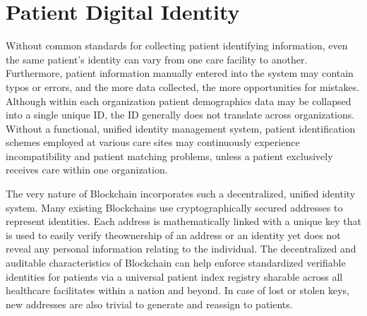 \documentclass[12pt]{report}
\begin{document}
\section{Patient Digital Identity}
\par Without common standards for collecting patient identifying information, even the
same patient’s identity can vary from one care facility to another.  Furthermore, patient information manually
entered into the system may contain typos or errors, and the more data collected, the more
opportunities for mistakes. Although within each organization patient demographics data
may be collapsed into a single unique ID, the ID generally does not translate across organizations.
Without a functional, unified identity management system, patient identification
schemes employed at various care sites may continuously experience incompatibility and patient matching problems, unless a patient exclusively receives care within one organization.
\par
The very nature of Blockchain incorporates such a decentralized, unified identity system. Many existing Blockchains use cryptographically secured addresses to represent identities. Each address is mathematically linked with a unique key that is used to easily verify theownership of an address or an identity yet does not reveal any personal information relating
to the individual. The decentralized and auditable characteristics of Blockchain can help enforce standardized verifiable identities for patients via a universal patient index registry sharable across all healthcare facilitates within a nation and beyond. In case of lost or stolen keys, new addresses are also trivial to generate and reassign to patients.
\end{document}
